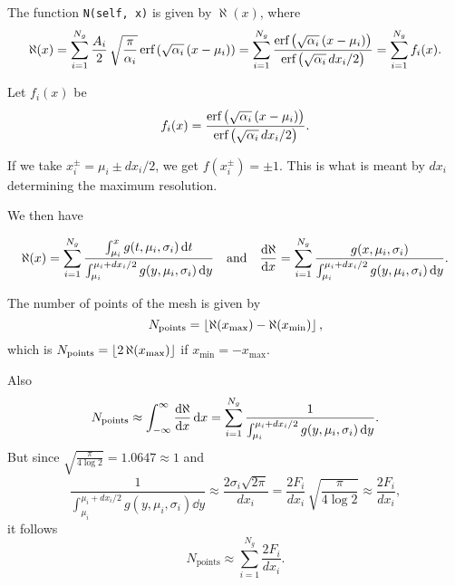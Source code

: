 \documentclass[a4paper,fleqn,12pt]{article}
\begin{document}
The function \texttt{N(self, x)} is given by $\aleph(x)$, where
$$
\aleph(x) = \sum_{i = 1}^{N_g} \frac{A_i}{2} \, \sqrt{\frac{\pi}{\alpha_i}} \,
\text{erf}\left(\sqrt{\alpha_i} \, (x - \mu_i)\right) =
\sum_{i=1}^{N_g}
\frac{\text{erf}\left(\sqrt{\alpha_i} \, (x - \mu_i)\right)}{\text{erf}\left(\sqrt{\alpha_i} \, dx_i / 2\right)} =
\sum_{i = 1}^{N_g} f_i(x).
$$

Let $f_i(x)$ be
$$
f_i(x) = \frac{\text{erf}\left(\sqrt{\alpha_i} \, (x - \mu_i)\right)}
{\text{erf}\left(\sqrt{\alpha_i} \, dx_i / 2\right)}.
$$

If we take $x_i^\pm = \mu_i \pm dx_i/2$, we get $f(x_i^\pm) = \pm 1$. This is what is meant by $dx_i$ determining the maximum resolution.

We then have

$$
\aleph(x) =
\sum_{i=1}^{N_g}
\frac{\int_{\mu_i}^x g(t, \mu_i, \sigma_i) \dd{t}}
{\int_{\mu_i}^{\mu_i + dx_i/2} g(y, \mu_i, \sigma_i) \dd{y}}
\quad \text{and} \quad
\dv{\aleph}{x} =
\sum_{i=1}^{N_g}
\frac{g(x, \mu_i, \sigma_i)}
{\int_{\mu_i}^{\mu_i + dx_i/2} g(y, \mu_i, \sigma_i) \dd{y}}.
$$

The number of points of the mesh is given by
$$
N_{\text{points}} = \left\lfloor \aleph(x_{\text{max}}) - \aleph(x_{\text{min}}) \right\rfloor,
$$
which is $N_{\text{points}} = \left\lfloor 2 \, \aleph(x_{\text{max}}) \right\rfloor$ if $x_{\text{min}} = - x_{\text{max}}$.

Also
$$
N_{\text{points}} \approx
\int_{-\infty}^{\infty} \dv{\aleph}{x} \dd{x} =
\sum_{i=1}^{N_g} \frac{1}
{\int_{\mu_i}^{\mu_i + dx_i/2} g(y, \mu_i, \sigma_i) \dd{y}}.
$$
But since $\sqrt{\frac{\pi}{4\log 2}} = 1.0647 \approx 1$ and
$$
\frac{1}{\int_{\mu_i}^{\mu_i + dx_i/2} g(y, \mu_i, \sigma_i) \dd{y}}
\approx \frac{2 \sigma_i \sqrt{2\pi}}{dx_i} =
\frac{2 F_i}{dx_i} \, \sqrt{\frac{\pi}{4\log 2}} \approx \frac{2 F_i}{dx_i},
$$
it follows
$$
\boxed{
N_{\text{points}} \approx \sum_{i=1}^{N_g} \frac{2 F_i}{dx_i}. }
$$
\end{document}
